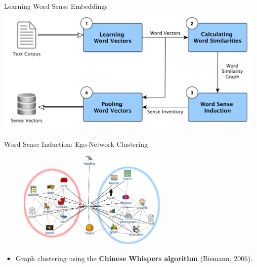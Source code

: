 \documentclass[accentcolor=tud9c,colorbacktitle,inverttitle,landscape,german,presentation]{tudbeamer}
\begin{document}


\begin{frame}{Learning Word Sense Embeddings}
	\includegraphics[width=\textwidth]{pipeline}
\end{frame}

\begin{frame}{Word Sense Induction: Ego-Network Clustering}

\centering
\begin{figure}
\includegraphics[width=0.65\textwidth]{table}
\end{figure}

\begin{itemize}
\item Graph clustering using the \textbf{Chinese Whispers algorithm} (Biemann, 2006).
\end{itemize}


\end{frame}
\end{document}
